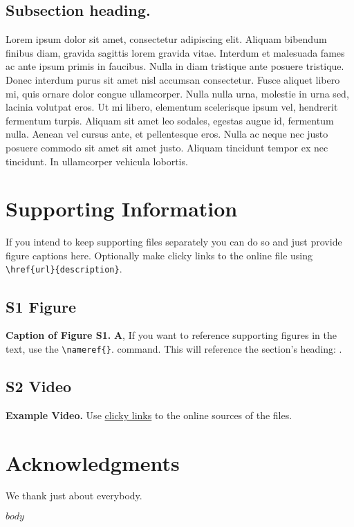 \documentclass[10pt,letterpaper]{article}
\begin{document}
\subsection*{Subsection heading.}

Lorem ipsum dolor sit amet, consectetur adipiscing elit. Aliquam bibendum finibus diam, gravida sagittis lorem gravida vitae. Interdum et malesuada fames ac ante ipsum primis in faucibus. Nulla in diam tristique ante posuere tristique. Donec interdum purus sit amet nisl accumsan consectetur. Fusce aliquet libero mi, quis ornare dolor congue ullamcorper. Nulla nulla urna, molestie in urna sed, lacinia volutpat eros. Ut mi libero, elementum scelerisque ipsum vel, hendrerit fermentum turpis. Aliquam sit amet leo sodales, egestas augue id, fermentum nulla. Aenean vel cursus ante, et pellentesque eros. Nulla ac neque nec justo posuere commodo sit amet sit amet justo. Aliquam tincidunt tempor ex nec tincidunt. In ullamcorper vehicula lobortis. 


\section*{Supporting Information}
If you intend to keep supporting files separately you can do so and just provide figure captions here. Optionally make clicky links to the online file using \verb!\href{url}{description}!.

\setcounter{figure}{0}
\renewcommand{\thefigure}{S\arabic{figure}}

\subsection*{S1 Figure}
\label{example_label}
{\bf Caption of Figure S1.} \textbf{A}, If you want to reference supporting figures in the text, use the \verb!\nameref{}!. command. This will reference the section's heading: .

\subsection*{S2 Video}
\label{example_video}
{\bf Example Video.} Use \href{www.youtube.com}{clicky links} to the online sources of the files.


\section*{Acknowledgments}
We thank just about everybody.


$body$

\nolinenumbers




\end{document}
